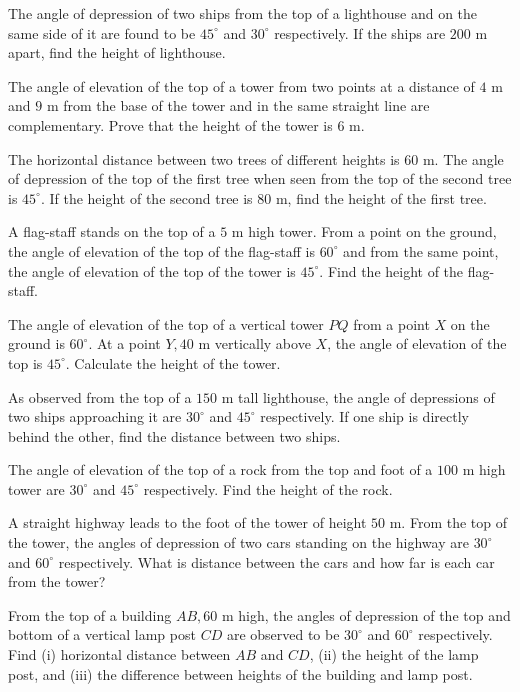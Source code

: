 \item The angle of depression of two ships from the top of a lighthouse and on the same side of it are found to be $45^\circ$
  and $30^\circ$ respectively. If the ships are $200$ m apart, find the height of lighthouse.

\item The angle of elevation of the top of a tower from two points at a distance of $4$ m and $9$ m from the base of the
  tower and in the same straight line are complementary. Prove that the height of the tower is $6$ m.

\item The horizontal distance between two trees of different heights is $60$ m. The angle of depression of the top of the first
  tree when seen from the top of the second tree is $45^\circ$. If the height of the second tree is $80$ m, find the
  height of the first tree.

\item A flag-staff stands on the top of a $5$ m high tower. From a point on the ground, the angle of elevation of the top of
  the flag-staff is $60^\circ$ and from the same point, the angle of elevation of the top of the tower is
  $45^\circ$. Find the height of the flag-staff.

\item The angle of elevation of the top of a vertical tower $PQ$ from a point $X$ on the ground is $60^\circ$. At a
  point $Y, 40$ m vertically above $X$, the angle of elevation of the top is $45^\circ$. Calculate the height
  of the tower.

\item As observed from the top of a $150$ m tall lighthouse, the angle of depressions of two ships approaching it are
  $30^\circ$ and $45^\circ$ respectively. If one ship is directly behind the other, find the distance between two
  ships.

\item The angle of elevation of the top of a rock from the top and foot of a $100$ m high tower are $30^\circ$ and
  $45^\circ$ respectively. Find the height of the rock.

\item A straight highway leads to the foot of the tower of height $50$ m. From the top of the tower, the angles of depression
  of two cars standing on the highway are $30^\circ$ and $60^\circ$ respectively. What is distance between the cars
  and how far is each car from the tower?

\item From the top of a building $AB, 60$ m high, the angles of depression of the top and bottom of a vertical lamp post
  $CD$ are observed to be $30^\circ$ and $60^\circ$ respectively. Find (i) horizontal distance between
  $AB$ and $CD$, (ii) the height of the lamp post, and (iii) the difference between heights of the building and lamp
  post.

